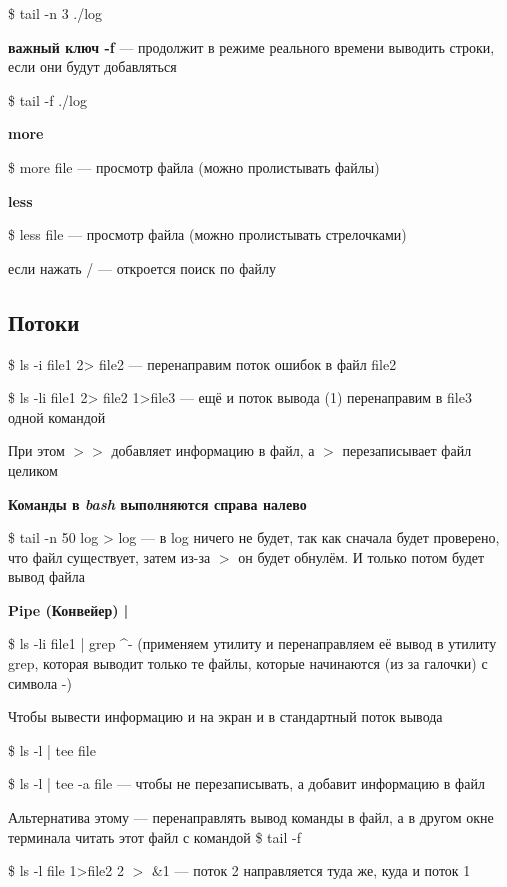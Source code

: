 \documentclass[oneside, final, 14pt]{extreport} %
\begin{document}
\$ tail -n 3 ./log 

\textbf{важный ключ -f} --- продолжит в режиме реального времени выводить строки, если 
они будут добавляться

\$ tail -f ./log 

\vspace*{\baselineskip}

\textbf{more}

\$ more file --- просмотр файла (можно пролистывать файлы)

\vspace*{\baselineskip}

\textbf{less}

\$ less file --- просмотр файла (можно пролистывать стрелочками)

если нажать / --- откроется поиск по файлу

\subsection{Потоки}
\$ ls -i file1 2> file2 --- перенаправим поток ошибок в файл file2

\$ ls -li file1 2> file2 1>file3 --- ещё и поток вывода (1) перенаправим в file3 одной командой

При этом $>>$ добавляет информацию в файл, а $>$ перезаписывает файл целиком

\textbf{Команды в \textit{bash} выполняются справа налево}

\$ tail -n 50 log > log --- в log ничего не будет, так как сначала будет проверено, что файл существует, 
затем из-за $>$ он будет обнулём. И только потом будет вывод файла

\textbf{Pipe (Конвейер) |}

\$ ls -li file1 | grep \^ \-- (применяем утилиту и перенаправляем её вывод в утилиту grep, которая 
выводит только те файлы, которые начинаются (из за галочки)  с символа \--)

Чтобы вывести информацию и на экран и в стандартный поток вывода

\$ ls -l | tee file

\$ ls -l | tee -a file --- чтобы не перезаписывать, а добавит информацию в файл

Альтернатива этому --- перенаправлять вывод команды в файл, а в другом окне 
терминала читать этот файл с командой \$ tail -f

\$ ls -l file 1>file2 2 $>$ \&1 --- поток 2 направляется туда же, куда и поток 1
\end{document}

